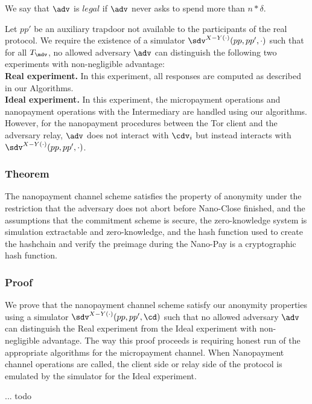 We say that $\adv$ is $legal$ if $\adv$ never asks to spend more than $n*\delta$.

Let $pp'$ be an auxiliary trapdoor not available to the participants of the real protocol. We require the existence of a simulator $\sdv^{X-Y(\cdot)}(pp, pp', \cdot)$ such that for all $T_\mdv$, no allowed adversary $\adv$ can distinguish the following two experiments with non-negligible advantage:\\
\textbf{Real experiment.} In this experiment, all responses are computed as described in our Algorithms.\\
\textbf{Ideal experiment.} In this experiment, the micropayment operations and nanopayment operations with the Intermediary are handled using our algorithms. However, for the nanopayment procedures between the Tor client and the adversary relay, $\adv$ does not interact with $\cdv_i$ but instead interacts with $\sdv^{X-Y(\cdot)}(pp,pp',\cdot)$.

\subsubsection{Theorem}
The nanopayment channel scheme satisfies the property of anonymity under the restriction that the adversary does not abort before Nano-Close finished, and the assumptions that the commitment scheme is secure, the zero-knowledge system is simulation extractable and zero-knowledge, and the hash function used to create the hashchain and verify the preimage during the Nano-Pay is a cryptographic hash function.

\subsubsection{Proof}

We prove that the nanopayment channel scheme satisfy our anonymity properties using a simulator $\sdv^{X-Y(\cdot)}(pp,pp',\cd)$ such that no allowed adversary $\adv$ can distinguish the Real experiment from the Ideal experiment with non-negligible advantage. The way this proof proceeds is requiring honest run of the appropriate algorithms for the micropayment channel. When Nanopayment channel operations are called, the client side or relay side of the protocol is emulated by the simulator for the Ideal experiment.

... todo
